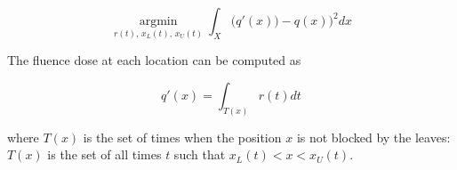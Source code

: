 \begin{equation}
\underset{r(t), \, x_L(t), \, x_U(t)}{\operatorname{argmin}}
\int_X \bigg(q'(x)) - q(x)\bigg)^2 dx
\label{eqn:fluenceMapOptimization}
\end{equation}

The fluence dose at each location can be computed as

\begin{equation}
q'(x) = \int_{T(x)} r(t) dt
\label{eqn:deliveredFluenceDose}
\end{equation}

where $T(x)$ is the set of times when the position $x$ is not blocked by the leaves:
$T(x)$ is the set of all times $t$ such that $ x_L(t) < x < x_U(t)$.
